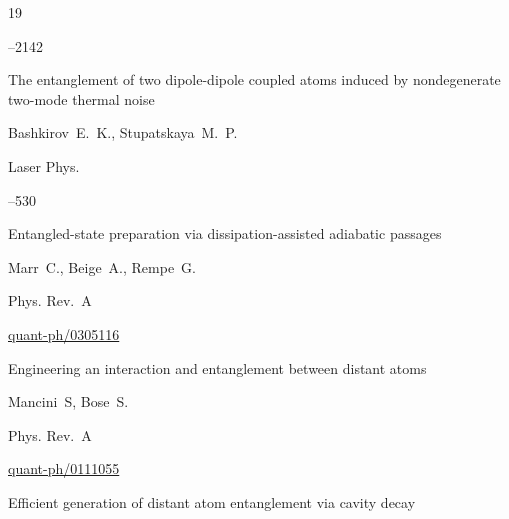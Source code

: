 \begin{thebibliography}{19}


--2142







\paper The entanglement of two dipole-dipole coupled atoms induced by nondegenerate two-mode thermal noise

\by  Bashkirov~E.~K.,  Stupatskaya~M.~P.

\jour Laser Phys.




--530





\paper Entangled-state preparation via dissipation-assisted adiabatic passages

\by   Marr~C., Beige~A., Rempe~G.

\jour Phys. Rev.~A





\arxiv \href{http://arxiv.org/abs/quant-ph/0305116}{quant-ph/0305116}





\paper Engineering an interaction and entanglement between distant atoms

\by    Mancini~S, Bose~S.

\jour Phys. Rev.~A





\arxiv \href{http://arxiv.org/abs/quant-ph/0111055}{quant-ph/0111055}





\paper Efficient generation of distant atom entanglement via cavity decay


\end{thebibliography}
